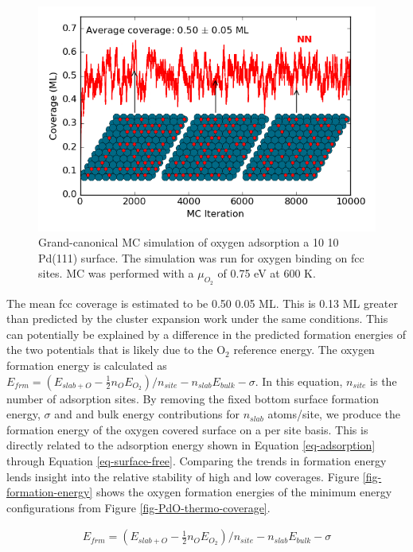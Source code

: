 \documentclass[12pt]{cmuthesis}
\begin{document}
\begin{figure}[htbp]
\centering
\includegraphics[width=5in]{./images/Pd-MC.png}
\caption{\label{fig-PdO-MC}
Grand-canonical MC simulation of oxygen adsorption a 10 \texttimes{} 10 Pd(111) surface. The simulation was run for oxygen binding on fcc sites. MC was performed with a \(\mu_{O_{2}}\) of 0.75 eV at 600 K.}
\end{figure}

The mean fcc coverage is estimated to be 0.50 \textpm{} 0.05 ML. This is 0.13 ML greater than predicted by the cluster expansion work under the same conditions. This can potentially be explained by a difference in the predicted formation energies of the two potentials that is likely due to the O\(_{\text{2}}\) reference energy. The oxygen formation energy is calculated as \(E_{frm} = (E_{slab+O} - \frac{1}{2} n_{O} E_{O_{2}})/n_{site} - n_{slab} E_{bulk} - \sigma\). In this equation, \(n_{site}\) is the number of adsorption sites. By removing the fixed bottom surface formation energy, \(\sigma\) and and bulk energy contributions for \(n_{slab}\) atoms/site, we produce the formation energy of the oxygen covered surface on a per site basis. This is directly related to the adsorption energy shown in Equation \ref{eq-adsorption} through Equation \ref{eq-surface-free}. Comparing the trends in formation energy lends insight into the relative stability of high and low coverages. Figure \ref{fig-formation-energy} shows the oxygen formation energies of the minimum energy configurations from Figure \ref{fig-PdO-thermo-coverage}.

\begin{eqnarray} \label{eq-formation}
E_{frm} = (E_{slab+O} - \frac{1}{2} n_{O} E_{O_{2}})/n_{site} - n_{slab} E_{bulk} - \sigma
\end{eqnarray}
\end{document}
